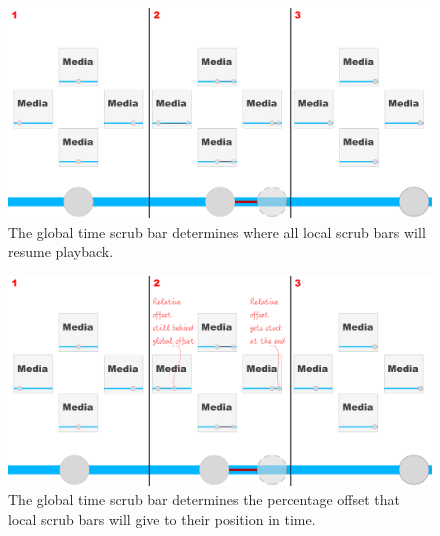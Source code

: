 
\begin{figure}
\centering
\includegraphics[width=1.35\textwidth, center]{images/move_along_with_global.png} %
\caption{The global time scrub bar determines where all local scrub bars will resume playback.}
\label{images:move_along_with_global}
\end{figure}

\begin{figure}
\centering
\includegraphics[width=1.35\textwidth, center]{images/move_along_with_offset.png} %
\caption{The global time scrub bar determines the percentage offset that local scrub bars will give to their position in time.}
\label{images:move_along_with_offset}
\end{figure}

